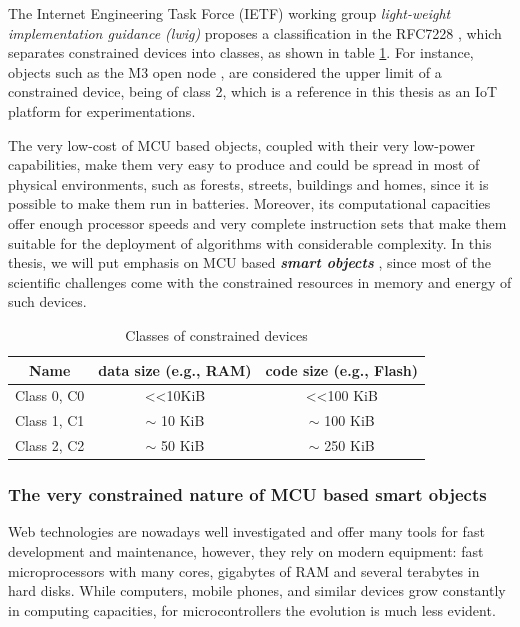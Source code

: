 The Internet Engineering Task Force (IETF) working group \textit{light-weight implementation guidance (lwig)} proposes a classification in the RFC7228 \cite{rfc7228}, which separates constrained devices into classes, as shown in table \ref{tab:DeviceClass}.
For instance, objects such as the M3 open node \cite{iotlab-m3}, are considered the upper limit of a constrained device, being of class 2, which is a reference in this thesis as an IoT platform for experimentations.

The very low-cost of MCU based objects, coupled with their very low-power capabilities, make them very easy to produce and could be spread in most of physical environments, such as forests, streets, buildings and homes, since it is possible to make them run in batteries.
Moreover, its computational capacities offer enough processor speeds and very complete instruction sets that make them suitable for the deployment of algorithms with considerable complexity.
In this thesis, we will put emphasis on MCU based \textit{\textbf{smart objects}} \cite{kortuem2010smart}, since most of the scientific challenges come with the constrained resources in memory and energy of such devices.

\begin{table}[htb]
	\centering
	\caption{Classes of constrained devices}
	\label{tab:DeviceClass}
	\begin{tabular}{|c|c|c|}
		\hline
		Name        & data size (e.g., RAM)    & code size (e.g., Flash)    \\ \hline
		Class 0, C0 & \textless\textless 10KiB & \textless\textless 100 KiB \\ \hline
		Class 1, C1 & $\sim$ 10 KiB                 & $\sim$ 100 KiB                  \\ \hline
		Class 2, C2 & $\sim$ 50 KiB                 & $\sim$ 250 KiB                  \\ \hline
	\end{tabular}
\end{table}



\subsubsection{The very constrained nature of MCU based smart objects}
Web technologies are nowadays well investigated and offer many tools for fast development and maintenance, however, they rely on modern equipment: fast microprocessors with many cores, gigabytes of RAM and several terabytes in hard disks.
While computers, mobile phones, and similar devices grow constantly in computing capacities, for microcontrollers the evolution is much less evident.

